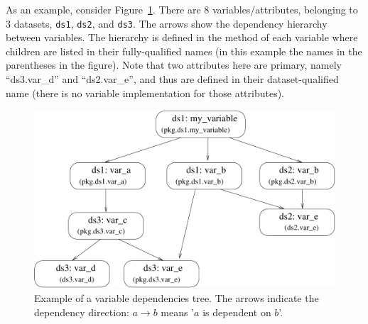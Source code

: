 {As an example, consider Figure~\ref{fig:opus-core-variable-tree}. There are 8
variables/attributes, \variablesindex\attributesindex belonging to 3 datasets, \datasetindex \verb|ds1|, \verb|ds2|, and
\verb|ds3|.  The arrows show the dependency hierarchy between variables. \variablesindex The
hierarchy is defined in the method  of each variable \variablesindex
where children are listed in their fully-qualified names (in
this example the names in the parentheses in the figure). Note that two
attributes \attributesindex here are primary, namely ``ds3.var_d'' and ``ds2.var_e'', and
thus are defined in their dataset-qualified \datasetindex name (there is no variable \variablesindex
implementation for those attributes). \attributesindex

\begin{figure}
\begin{center}
\includegraphics[scale=0.6]{images/variabletreeinitial.pdf}
\caption{\label{fig:opus-core-variable-tree}\small Example of a variable
  dependencies tree. The arrows indicate the dependency direction: 
  $a \longrightarrow b$ means '$a$ is dependent on $b$'.}
\end{center}
\end{figure}

}
